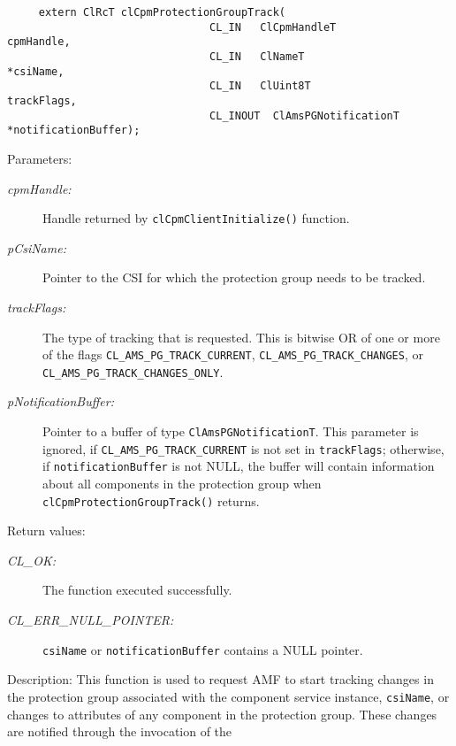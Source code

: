 {\begin{Desc}
\footnotesize\begin{verbatim}     extern ClRcT clCpmProtectionGroupTrack(
                      			CL_IN   ClCpmHandleT                cpmHandle,
                      			CL_IN   ClNameT                     *csiName,
                      			CL_IN   ClUint8T                    trackFlags,
                      			CL_INOUT  ClAmsPGNotificationT    *notificationBuffer);
\end{verbatim}
\normalsize
\end{Desc}
\begin{Desc}
\item[Parameters:]
\begin{description}
\item[{\em cpm\-Handle:}]Handle returned by {\tt{cl\-Cpm\-Client\-Initialize()}} function. 
\item[{\em p\-Csi\-Name:}]Pointer to the CSI for which the protection group needs to be tracked. 
\item[{\em track\-Flags:}]The type of tracking that is requested. This is bitwise OR of one or more of the flags 
{\tt{CL\_\-AMS\_\-PG\_\-TRACK\_\-CURRENT}}, {\tt{CL\_\-AMS\_\-PG\_\-TRACK\_\-CHANGES}}, or {\tt{CL\_\-AMS\_\-PG\_\-TRACK\_\-CHANGES\_\-ONLY}}. 
\item[{\em p\-Notification\-Buffer:}]Pointer to a buffer of type {\tt{Cl\-Ams\-PGNotification\-T}}. This parameter is ignored, if
{\tt{CL\_\-AMS\_\-PG\_\-TRACK\_\-CURRENT}} is not set in {\tt{track\-Flags}}; otherwise, if {\tt{notification\-Buffer}} is not NULL, the buffer will
contain information about all components in the protection group when {\tt{cl\-Cpm\-Protection\-Group\-Track()}} returns.\end{description}
\end{Desc}
\begin{Desc}
\item[Return values:]
\begin{description}
\item[{\em CL\_\-OK:}]The function executed successfully. \item[{\em CL\_\-ERR\_\-NULL\_\-POINTER:}]{\tt{csiName}} or {\tt{notificationBuffer}}
contains a NULL pointer.\end{description}
\end{Desc}
\begin{Desc}
\item[Description:]This function is used to request AMF to start tracking changes in the protection group associated with the component service instance, 
{\tt{csi\-Name}}, or changes to attributes of any component in the protection group. These changes are notified through the invocation of the

\end{Desc}}
